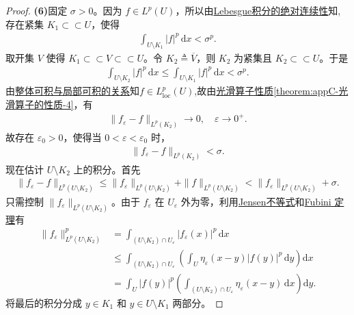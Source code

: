 \documentclass[../main.tex]{subfiles}
\begin{document}
\begin{proof}
\textbf{(6)}固定 \(\sigma>0\)。因为 \(f\in L^p(U)\)，所以由\hyperref[Real Analysis-theorem:积分的绝对连续性]{Lebesgue积分的绝对连续性}知,存在紧集 \(K_1\subset\subset U\)，使得
\begin{align*}
\int_{U\setminus K_1}|f|^p\,\mathrm{d}x<\sigma^p.
\end{align*}
取开集 \(V\) 使得 \(K_1\subset\subset V\subset\subset U\)。令 \(K_2\triangleq\overline{V}\)，则 \(K_2\) 为紧集且 \(K_2\subset\subset U\)。于是
\begin{align*}
\int_{U\setminus K_2}|f|^p\,\mathrm{d}x\leqslant\int_{U\setminus K_1}|f|^p\,\mathrm{d}x<\sigma^p.
\end{align*}
由\hyperref[proposition:整体可积与局部可积的关系]{整体可积与局部可积的关系}知$f\in L_{\text{loc}}^p(U)$,故由\hyperref[theorem:appC-光滑算子的性质]{光滑算子性质\ref{theorem:appC-光滑算子的性质-4}}，有
\begin{align*}
\|f_\varepsilon-f\|_{L^p(K_2)}\to0,\quad \varepsilon\to0^+.
\end{align*}
故存在 \(\varepsilon_0>0\)，使得当 \(0<\varepsilon<\varepsilon_0\) 时，
\begin{align}\label{eqHJFIJOFIOWJIOWIJO-1}
\|f_\varepsilon-f\|_{L^p(K_2)}<\sigma.
\end{align}
现在估计 \(U\setminus K_2\) 上的积分。首先
\begin{align}\label{eqHJFIJOFIOWJIOWIJO-2}
\|f_\varepsilon-f\|_{L^p(U\setminus K_2)}
\leqslant\|f_\varepsilon\|_{L^p(U\setminus K_2)}+\|f\|_{L^p(U\setminus K_2)}<\|f_\varepsilon\|_{L^p(U\setminus K_2)}+\sigma.
\end{align}
只需控制 \(\|f_\varepsilon\|_{L^p(U\setminus K_2)}\)。由于 \(f_\varepsilon\) 在 \(U_\varepsilon\) 外为零，利用\hyperref[Real Analysis-theorem:Jensen不等式]{Jensen不等式}和\hyperref[Real Analysis-theorem:实变函数-Fubini定理]{Fubini 定理}有
\begin{align}
\|f_\varepsilon\|_{L^p(U\setminus K_2)}^p
&=\int_{(U\setminus K_2)\cap U_\varepsilon}|f_\varepsilon(x)|^p\,\mathrm{d}x\nonumber\\
&\leqslant\int_{(U\setminus K_2)\cap U_\varepsilon}\left(\int_U\eta_\varepsilon(x-y)|f(y)|^p\,\mathrm{d}y\right)\mathrm{d}x\nonumber\\
&=\int_U|f(y)|^p\left(\int_{(U\setminus K_2)\cap U_\varepsilon}\eta_\varepsilon(x-y)\,\mathrm{d}x\right)\mathrm{d}y.\label{HFIOUHJEIOWJIOWJIOJWIODIJOIJOeq-1}
\end{align}
将最后的积分分成 \(y\in K_1\) 和 \(y\in U\setminus K_1\) 两部分。


\end{proof}
\end{document}
